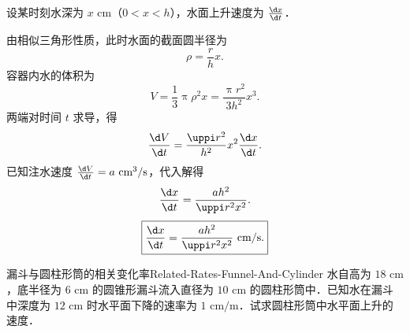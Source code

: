 \begin{solution}
    设某时刻水深为 $x\text{ cm}$（$0 < x < h$），水面上升速度为 $\frac{\d x}{\d t}$．

    由相似三角形性质，此时水面的截面圆半径为
    \begin{equation}
        \rho = \frac{r}{h} x.
    \end{equation}
    容器内水的体积为
    \begin{equation}
        V = \frac{1}{3}\uppi \rho^2 x = \frac{\uppi r^2}{3h^2} x^3.
    \end{equation}
    两端对时间 $t$ 求导，得
    \begin{equation}
        \frac{\d V}{\d t} = \frac{\uppi r^2}{h^2} x^2 \frac{\d x}{\d t}.
    \end{equation}
    已知注水速度 $\frac{\d V}{\d t} = a\text{ cm}^3/\text{s}$，代入解得
    \begin{equation}
        \frac{\d x}{\d t} = \frac{a h^2}{\uppi r^2 x^2}.
    \end{equation}
    \begin{equation}
        \boxed{\frac{\d x}{\d t} = \frac{a h^2}{\uppi r^2 x^2}\text{ cm}/\text{s}.}
    \end{equation}
\end{solution}

\begin{problem}{漏斗与圆柱形筒的相关变化率}{Related-Rates-Funnel-And-Cylinder}
    水自高为 $18\text{ cm}$，底半径为 $6\text{ cm}$ 的圆锥形漏斗流入直径为 $10\text{ cm}$ 的圆柱形筒中．已知水在漏斗中深度为 $12\text{ cm}$ 时水平面下降的速率为 $1\text{ cm}/\text{m}$．试求圆柱形筒中水平面上升的速度．
\end{problem}

